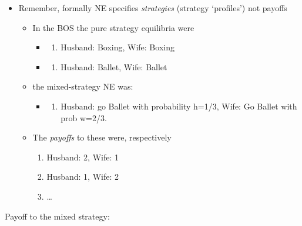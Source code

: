 \documentclass[]{article}
\providecommand{\tightlist}{%
  \setlength{\itemsep}{0pt}\setlength{\parskip}{0pt}}
\begin{document}
\begin{itemize}
\tightlist
\item
  Remember, formally NE specifies \emph{strategies} (strategy
  `profiles') not payoffs

  \begin{itemize}
  \tightlist
  \item
    In the BOS the pure strategy equilibria were

    \begin{itemize}
    \item
      \begin{enumerate}
      \def\labelenumi{\roman{enumi}.}
      \tightlist
      \item
        Husband: Boxing, Wife: Boxing
      \end{enumerate}
    \item
      \begin{enumerate}
      \def\labelenumi{\roman{enumi}.}
      \setcounter{enumi}{1}
      \tightlist
      \item
        Husband: Ballet, Wife: Ballet
      \end{enumerate}
    \end{itemize}
  \item
    the mixed-strategy NE was:

    \begin{itemize}
    \item
      \begin{enumerate}
      \def\labelenumi{\roman{enumi}.}
      \setcounter{enumi}{2}
      \tightlist
      \item
        Husband: go Ballet with probability h=1/3, Wife: Go Ballet with
        prob w=2/3.
      \end{enumerate}
    \end{itemize}
  \item
    The \emph{payoffs} to these were, respectively

    \begin{enumerate}
    \def\labelenumi{\roman{enumi}.}
    \tightlist
    \item
      Husband: 2, Wife: 1
    \item
      Husband: 1, Wife: 2
    \item
      \ldots{}
    \end{enumerate}
  \end{itemize}
\end{itemize}

Payoff to the mixed strategy:
\end{document}
